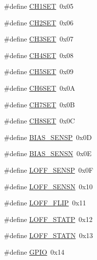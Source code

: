 \begin{DoxyCompactItemize}
\#define \hyperlink{group___definitions___a_d_s1299_ga8fea370fa35eeb28355a58a40783ec99}{C\+H1\+S\+E\+T}~0x05
\item 
\#define \hyperlink{group___definitions___a_d_s1299_ga3e8ab2c505cc6f00a1807a151a9ebcdb}{C\+H2\+S\+E\+T}~0x06
\item 
\#define \hyperlink{group___definitions___a_d_s1299_ga70dccc80e613cfc0eea471983aecc229}{C\+H3\+S\+E\+T}~0x07
\item 
\#define \hyperlink{group___definitions___a_d_s1299_ga0d9979e6e1d8b4e7727063b2660ac10b}{C\+H4\+S\+E\+T}~0x08
\item 
\#define \hyperlink{group___definitions___a_d_s1299_gaff7800e91abe1001d9e3c9febc34e0d3}{C\+H5\+S\+E\+T}~0x09
\item 
\#define \hyperlink{group___definitions___a_d_s1299_ga4708b2ba51cdb3a41817f06b8982657f}{C\+H6\+S\+E\+T}~0x0\+A
\item 
\#define \hyperlink{group___definitions___a_d_s1299_ga018ba15c7462bc82cae0c3695d4c0ed0}{C\+H7\+S\+E\+T}~0x0\+B
\item 
\#define \hyperlink{group___definitions___a_d_s1299_ga9e870ff4a991cadaab80c387e09b33de}{C\+H8\+S\+E\+T}~0x0\+C
\item 
\#define \hyperlink{group___definitions___a_d_s1299_gadee1ef2aa548da6eb85a1f103bd50471}{B\+I\+A\+S\+\_\+\+S\+E\+N\+S\+P}~0x0\+D
\item 
\#define \hyperlink{group___definitions___a_d_s1299_gac8197f544e39562ab0b4e67ad7d4410b}{B\+I\+A\+S\+\_\+\+S\+E\+N\+S\+N}~0x0\+E
\item 
\#define \hyperlink{group___definitions___a_d_s1299_gab3086af5aee3864fbaee44f58fbd90fa}{L\+O\+F\+F\+\_\+\+S\+E\+N\+S\+P}~0x0\+F
\item 
\#define \hyperlink{group___definitions___a_d_s1299_ga62fffa8684b8eae61de347e70fedef39}{L\+O\+F\+F\+\_\+\+S\+E\+N\+S\+N}~0x10
\item 
\#define \hyperlink{group___definitions___a_d_s1299_ga167c29fc8bc9fe36ff80fbab3aef76d0}{L\+O\+F\+F\+\_\+\+F\+L\+I\+P}~0x11
\item 
\#define \hyperlink{group___definitions___a_d_s1299_ga80a21df4016d8e925264718cf7e4b74b}{L\+O\+F\+F\+\_\+\+S\+T\+A\+T\+P}~0x12
\item 
\#define \hyperlink{group___definitions___a_d_s1299_ga294d95c8864fdd237709e896fc0b7f2c}{L\+O\+F\+F\+\_\+\+S\+T\+A\+T\+N}~0x13
\item 
\#define \hyperlink{group___definitions___a_d_s1299_ga1037b18e2d226fe7d327d4a6f17a21c1}{G\+P\+I\+O}~0x14
\item 

\end{DoxyCompactItemize}
